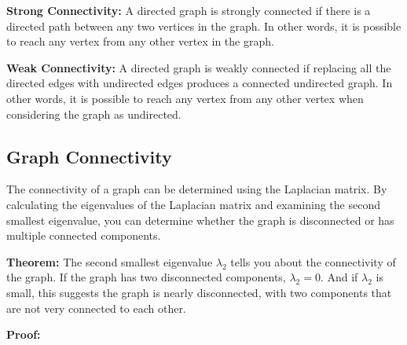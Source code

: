 \documentclass{article}
\begin{document}
\textbf{Strong Connectivity:}
A directed graph is strongly connected if there is a directed path between any two vertices in the graph. In other words, it is possible to reach any vertex from any other vertex in the graph.

\textbf{Weak Connectivity:}
A directed graph is weakly connected if replacing all the directed edges with undirected edges produces a connected undirected graph. In other words, it is possible to reach any vertex from any other vertex when considering the graph as undirected.

\subsection*{Graph Connectivity}

The connectivity of a graph can be determined using the Laplacian matrix. By calculating the eigenvalues of the Laplacian matrix and examining the second smallest eigenvalue, you can determine whether the graph is disconnected or has multiple connected components.

\textbf{Theorem:} The second smallest eigenvalue $\lambda_2$ tells you about the connectivity of the graph. If the graph has two disconnected components, $\lambda_2 = 0$. And if $\lambda_2$ is small, this suggests the graph is nearly disconnected, with two components that are not very connected to each other.

\textbf{Proof:}
\end{document}
